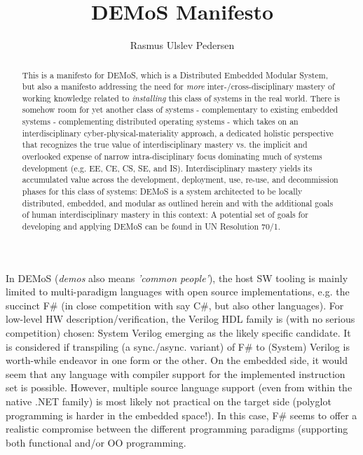 \documentclass[11pt]{article}
\begin{document}
\title{DEMoS Manifesto}
\author{Rasmus Ulslev Pedersen}
\maketitle
\begin{abstract}
This is a manifesto for DEMoS, which is a Distributed Embedded Modular System, but also a manifesto addressing the need for \textit{more} inter-/cross-disciplinary mastery of working knowledge related to \textit{installing} this class of systems in the real world. There is somehow room for yet another class of systems - complementary to existing embedded systems - complementing distributed operating systems - which takes on an interdisciplinary cyber-physical-materiality approach, a dedicated holistic perspective that recognizes the true value of interdisciplinary mastery vs. the implicit and overlooked expense of narrow intra-disciplinary focus dominating much of systems development (e.g. EE, CE, CS, SE, and IS). Interdisciplinary mastery yields its accumulated value across the development, deployment, use, re-use, and decommission phases for this class of systems: DEMoS is a system architected to be locally distributed, embedded, and modular as outlined herein and with the additional goals of human interdisciplinary mastery in this context: A potential set of goals for developing and applying DEMoS can be found in UN Resolution 70/1.
\end{abstract}
 In DEMoS \cite{Demos2016} (\textit{demos} also means \textit{'common people'}), the host SW tooling is mainly limited to multi-paradigm languages with open source implementations, e.g. the succinct F\# (in close competition with say C\#, but also other languages). For low-level HW description/verification, the Verilog HDL family is (with no serious competition) chosen: System Verilog emerging as the likely specific candidate. It is considered if transpiling (a sync./async. variant) of F\# to (System) Verilog is worth-while endeavor in one form or the other. On the embedded side, it would seem that any language with compiler support for the implemented instruction set is possible. However, multiple source language support (even from within the native .NET family) is most likely not practical on the target side (polyglot programming is harder in the embedded space!). In this case, F\# \cite{Syme2011} seems to offer a realistic compromise between the different programming paradigms (supporting both functional and/or OO programming.
\end{document}
